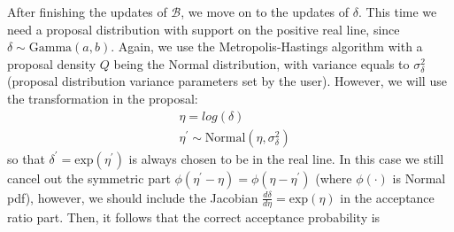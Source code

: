 \documentclass[a4paper]{article}
\begin{document}

After finishing the updates of $\mathcal{B}$, we move on to the updates of $\delta$. This time we need a proposal distribution with support on the positive real line, since $ \delta \sim \mbox{Gamma}(a, b)$.  Again, we use the Metropolis-Hastings algorithm with a proposal density $Q$ being the Normal distribution, with variance equals to $\sigma^2_\delta$ (proposal distribution variance parameters set by the user). However, we will use the transformation in the proposal:
\begin{equation*}
\begin{aligned}
& \eta = log(\delta)\\
&\eta^\prime \sim \mbox{Normal}(\eta, \sigma^2_\delta)
\end{aligned}
\end{equation*}
so that $\delta^\prime = \mbox{exp}(\eta^\prime)$ is always chosen to be in the real line. In this case we  still cancel out the symmetric part $\phi(\eta^\prime-\eta) =\phi(\eta-\eta^\prime)$ (where $\phi(\cdot)$ is Normal pdf), however, we should include the Jacobian $\frac{d\delta}{d\eta} = \mbox{exp}(\eta)$ in the acceptance ratio part. Then, it follows that the correct acceptance probability is 
\end{document}
